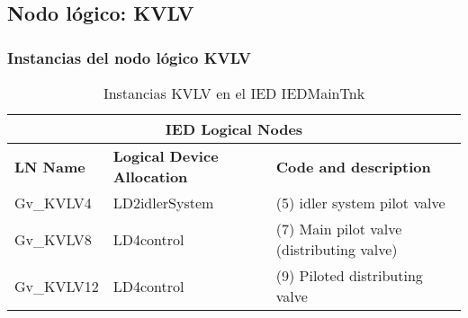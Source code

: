 
\subsection{Nodo l\'ogico: 			 KVLV}

    \subsubsection{Instancias del nodo l\'ogico KVLV}
    \begin{table}[H]
    \begin{center}
    \begin{tabular}{|l|l|p{6.8cm}|}
            \hline
            \multicolumn{3}{|c|}{\cellcolor[gray]{0.8} \textbf{IED Logical Nodes} } \\
            \hline
            \textbf{LN Name} & \textbf{Logical Device Allocation} & \textbf{Code and description} \\
            \hline
            Gv\_KVLV4 & LD2idlerSystem & (5) idler system pilot valve \\
            \hline
            Gv\_KVLV8 & LD4control & (7) Main pilot valve (distributing valve) \\
            \hline
            Gv\_KVLV12 & LD4control & (9) Piloted distributing valve \\
            \hline
    \end{tabular}
    \caption{Instancias KVLV en el IED IEDMainTnk}
    \label{table:lnInstKVLV_piloted}
    \end{center}
    \end{table}
    
    
    
